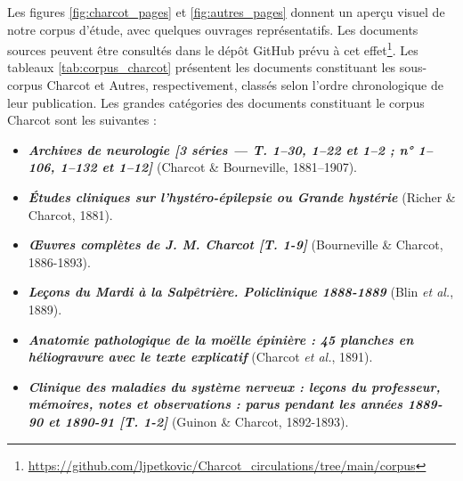 Les figures \ref{fig:charcot_pages} et \ref{fig:autres_pages} donnent un aperçu visuel de notre corpus d'étude, avec quelques ouvrages représentatifs. Les documents sources peuvent être consultés dans le dépôt GitHub prévu à cet effet\footnote{\url{https://github.com/ljpetkovic/Charcot_circulations/tree/main/corpus}}. Les tableaux \ref{tab:corpus_charcot} présentent les documents constituant les sous-corpus Charcot et Autres, respectivement, classés selon l'ordre chronologique de leur publication. Les grandes catégories des documents constituant le corpus \og{}Charcot\fg{} sont les suivantes :
\begin{itemize}
	\item \textit{\textbf{Archives de neurologie [3 séries — T. 1–30, 1–22 et 1–2 ; n° 1–106, 1–132 et 1–12]}} (Charcot \& Bourneville, 1881–1907).
	\item \textit{\textbf{Études cliniques sur l'hystéro-épilepsie ou Grande hystérie}} (Richer \& Charcot, 1881).
	\item \textit{\textbf{\OE{}uvres complètes de J. M. Charcot [T. 1-9]}} (Bourneville \& Charcot, 1886-1893). 
	\item \textbf{\textit{Leçons du Mardi à la Salpêtrière. Policlinique 1888-1889}} (Blin \textit{et al.}, 1889).
	\item \textbf{\textit{Anatomie pathologique de la moëlle épinière : 45 planches en héliogravure avec le texte explicatif}} (Charcot \textit{et al.}, 1891).
	\item \textbf{\textit{Clinique des maladies du système nerveux : leçons du professeur, mémoires, notes et observations : parus pendant les années 1889-90 et 1890-91 [T. 1-2]}} (Guinon \& Charcot, 1892-1893).
\end{itemize}

\begingroup
\renewcommand{\arraystretch}{1.5}  %

